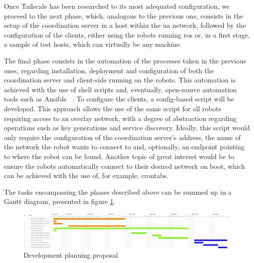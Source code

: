 \documentclass[11pt,twoside,a4paper]{report}
\begin{document}
Once Tailscale has been researched to its most adequated configuration, we proceed to the next phase, which, analogous to the previous one, consists in the setup of the coordination server in a host within the \acrshort{ua} network, followed by the configuration of the clients, either using the robots running \acrshort{ros} or, in a first stage, a sample of test hosts, which can virtually be any machine.

The final phase consists in the automation of the processes taken in the previous ones, regarding installation, deployment and configuration of both the coordination server and client-side running on the robots. This automation is achieved with the use of shell scripts and, eventually, open-source automation tools such as Ansible ~\cite{ansiblews}. To configure the clients, a config-based script will be developed. This approach allows the use of the same script for all robots requiring access to an overlay network, with a degree of abstraction regarding operations such as key generations and service discovery. Ideally, this script would only require the configuration of the coordination server's address, the name of the network the robot wants to connect to and, optionally, an endpoint pointing to where the robot can be found. Another topic of great interest would be to ensure the robots automatically connect to their desired network on boot, which can be achieved with the use of, for example, crontabs.

The tasks encompassing the phases described above can be summed up in a Gantt diagram, presented in figure \ref{fig:gantt}.

\begin{figure}[h]
\centering
\includegraphics[width=1\textwidth]{gantt.png}
\caption{Development planning proposal}
\label{fig:gantt}
\end{figure}

%
%
\cleardoublepage
\iffalse
\else






\cleardoublepage
\end{document}
